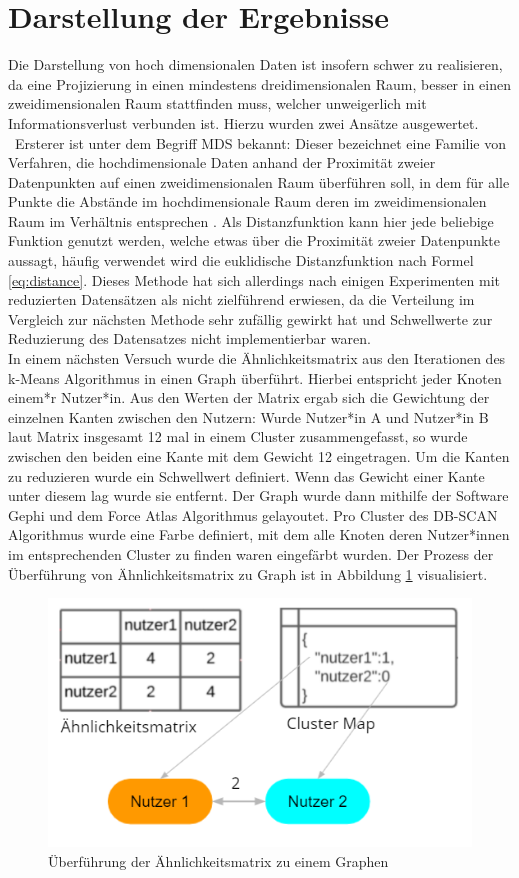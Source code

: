 \section{Darstellung der Ergebnisse}
Die Darstellung von hoch dimensionalen Daten ist insofern schwer zu realisieren, da eine Projizierung in einen mindestens dreidimensionalen Raum, besser in einen zweidimensionalen Raum stattfinden muss, welcher unweigerlich mit Informationsverlust verbunden ist. Hierzu wurden zwei Ansätze ausgewertet. \\ \newline\
Ersterer ist unter dem Begriff \ac{MDS} bekannt: Dieser bezeichnet eine Familie von Verfahren, die hochdimensionale Daten anhand der Proximität zweier Datenpunkten auf einen zweidimensionalen Raum überführen soll, in dem für alle Punkte die Abstände im hochdimensionale Raum deren im zweidimensionalen Raum im Verhältnis entsprechen \cite{Borg.2010}. Als Distanzfunktion kann hier jede beliebige Funktion genutzt werden, welche etwas über die Proximität zweier Datenpunkte aussagt, häufig verwendet wird die euklidische Distanzfunktion nach Formel \ref{eq:distance}. Dieses Methode hat sich allerdings nach einigen Experimenten mit reduzierten Datensätzen als nicht zielführend erwiesen, da die Verteilung im Vergleich zur nächsten Methode sehr zufällig gewirkt hat und Schwellwerte zur Reduzierung des Datensatzes nicht implementierbar waren. \\ \newline
In einem nächsten Versuch wurde die Ähnlichkeitsmatrix aus den Iterationen des k-Means Algorithmus in einen Graph überführt. Hierbei entspricht jeder Knoten einem*r Nutzer*in. Aus den Werten der Matrix ergab sich die Gewichtung der einzelnen Kanten zwischen den Nutzern: Wurde Nutzer*in A und Nutzer*in B laut Matrix insgesamt 12 mal in einem Cluster zusammengefasst, so wurde zwischen den beiden eine Kante mit dem Gewicht 12 eingetragen. Um die Kanten zu reduzieren wurde ein Schwellwert definiert. Wenn das Gewicht einer Kante unter diesem lag wurde sie entfernt. Der Graph wurde dann mithilfe der Software Gephi und dem Force Atlas Algorithmus gelayoutet. Pro Cluster des DB-SCAN Algorithmus wurde eine Farbe definiert, mit dem alle Knoten deren Nutzer*innen im entsprechenden Cluster zu finden waren eingefärbt wurden. Der Prozess der Überführung von Ähnlichkeitsmatrix zu Graph ist in Abbildung \ref{fig:consensus_matrix_to_graph} visualisiert. \\ \newline
\begin{figure}[h]
	\centering
	\includegraphics[width=0.6\linewidth]{images/consensus_matrix_to_graph}
	\caption{Überführung der Ähnlichkeitsmatrix zu einem Graphen}
	\label{fig:consensus_matrix_to_graph}
\end{figure}
